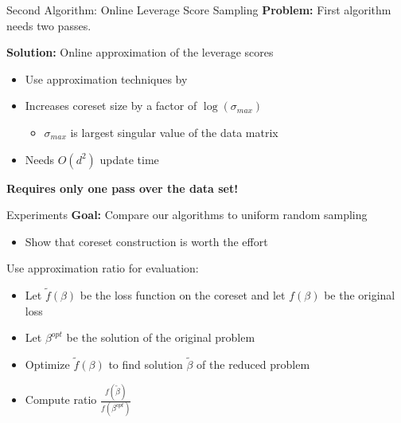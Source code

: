 \documentclass[gray]{beamer}
\begin{document}
\begin{frame}{Second Algorithm: Online Leverage Score Sampling}
    \textbf{Problem:} First algorithm needs two passes.

    \vspace{\fill}

    \textbf{Solution:} Online approximation of the leverage scores
    \begin{itemize}
        \item Use approximation techniques by \cite{tensor-factorization}
        \item Increases coreset size by a factor of $\log(\sigma_{max})$
              \begin{itemize}
                  \item $\sigma_{max}$ is largest singular value of the data matrix
              \end{itemize}
        \item Needs $O(d^2)$ update time
    \end{itemize}

    \vspace{\fill}

    \textbf{Requires only one pass over the data set!}
\end{frame}

\begin{frame}{Experiments}
    \textbf{Goal:} Compare our algorithms to uniform random sampling
    \begin{itemize}
        \item Show that coreset construction is worth the effort
    \end{itemize}

    \vspace{\fill}

    Use approximation ratio for evaluation:
    \begin{itemize}
        \item Let $\tilde{f}(\beta)$ be the loss function on the coreset
              and let $f(\beta)$ be the original loss
        \item Let $\beta^{opt}$ be the solution of the original problem
        \item Optimize $\tilde{f}(\beta)$ to find solution $\tilde{\beta}$
              of the reduced problem
        \item Compute ratio $\frac{f(\tilde{\beta})}{f(\beta^{opt})}$
    \end{itemize}
\end{frame}
\end{document}
